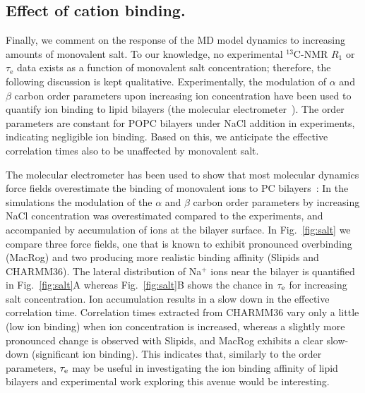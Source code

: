 \documentclass[journal=jpcbfk,manuscript=article,layout=twocolumn]{achemso}
\begin{document}
\subsection*{Effect of cation binding.}

Finally, we comment on the response of the MD model dynamics to increasing amounts of monovalent salt.
To our knowledge, no experimental $^{13}$C-NMR $R_1$ or $\tau_\mathrm e$ data exists as a function of monovalent salt concentration; therefore, the following discussion is kept qualitative.
Experimentally, the modulation of $\alpha$ and $\beta$ carbon order parameters upon increasing ion concentration have been used to quantify ion binding to lipid bilayers (the molecular electrometer~\cite{seeling87,catte16}). The order parameters are constant for POPC bilayers under NaCl addition in experiments, indicating negligible ion binding. Based on this, we anticipate the effective correlation times also to be unaffected by monovalent salt. %

The molecular electrometer has been used to show that most molecular dynamics force fields overestimate the binding of monovalent ions to PC bilayers~\cite{catte16}: In the simulations the modulation of the $\alpha$ and $\beta$ carbon order parameters by increasing NaCl concentration was overestimated compared to the experiments, and accompanied by accumulation of ions at the bilayer surface. In Fig.~\ref{fig:salt} we compare three force fields, one that is known to exhibit pronounced overbinding~\cite{catte16} (MacRog) and two producing more realistic binding affinity (Slipids and CHARMM36). The lateral distribution of Na$^{+}$ ions near the bilayer is quantified in Fig.~\ref{fig:salt}A whereas Fig.~\ref{fig:salt}B shows the chance in $\tau_{\rm{e}}$ for increasing salt concentration. Ion accumulation results in a slow down in the effective correlation time. %
Correlation times extracted from CHARMM36 vary only a little (low ion binding) when ion concentration is increased, whereas a slightly more pronounced change is observed with Slipids, and MacRog exhibits a clear slow-down (significant ion binding). This indicates that, similarly to the order parameters, $\tau_{\rm{e}}$ may be useful in investigating the ion binding affinity of lipid bilayers and experimental work exploring this avenue would be interesting.   
\end{document}
